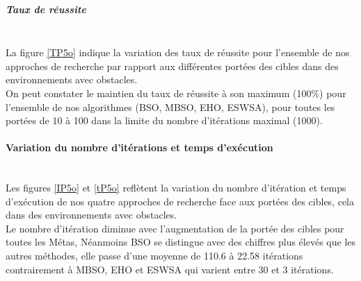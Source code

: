 \noindent
\begin{minipage}[t]{0.5\textwidth}
	\subparagraph{Taux de réussite}
	\textbf{}\\
	
	La figure \ref{TP5o} indique la variation des taux de réussite pour l'ensemble de nos approches de recherche par rapport aux différentes portées des cibles dans des environnements avec obstacles.\\
	
	On peut constater le maintien du taux de réussite à son maximum (100\%) pour l'ensemble de nos algorithmes (BSO, MBSO, EHO, ESWSA), pour toutes les portées de 10 à 100 dans la limite du nombre d'itérations maximal (1000).
	
	
\end{minipage}\hfill
\begin{minipage}[t]{0.55\textwidth}
	\captionsetup{width=0.8\linewidth}
	\centering{}
	\label{TP5o}
\end{minipage}\hfill



\vspace{0.3cm}


\noindent
	\paragraph{Variation du nombre d'itérations et temps d'exécution}
	\textbf{ }\\
	
	Les figures \ref{IP5o} et \ref{tP5o} reflètent la variation du nombre d'itération et temps d'exécution de nos quatre approches de recherche face aux portées des cibles, cela dans des environnements avec obstacles.\\
	
	Le nombre d'itération diminue avec l'augmentation de la portée des cibles pour toutes les Métas, Néanmoins BSO se distingue avec des chiffres plus élevés que les autres méthodes, elle passe d'une moyenne de 110.6 à 22.58 itérations contrairement à MBSO, EHO et ESWSA qui varient entre 30 et 3 itérations.\\

